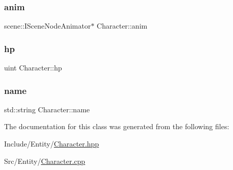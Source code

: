 \subsubsection{\texorpdfstring{anim}{anim}}
{\footnotesize\ttfamily scene\+::\+I\+Scene\+Node\+Animator$\ast$ Character\+::anim\hspace{0.3cm}{\ttfamily [protected]}}

\mbox{\label{class_character_a1f1db0752324d315af1029a7b08bdea7}} 
\subsubsection{\texorpdfstring{hp}{hp}}
{\footnotesize\ttfamily uint Character\+::hp\hspace{0.3cm}{\ttfamily [protected]}}

\mbox{\label{class_character_a6592c35167738421f3e04ca8808d37db}} 
\subsubsection{\texorpdfstring{name}{name}}
{\footnotesize\ttfamily std\+::string Character\+::name\hspace{0.3cm}{\ttfamily [protected]}}



The documentation for this class was generated from the following files\+:\begin{DoxyCompactItemize}
\item 
Include/\+Entity/\mbox{\hyperlink{_character_8hpp}{Character.\+hpp}}\item 
Src/\+Entity/\mbox{\hyperlink{_character_8cpp}{Character.\+cpp}}\end{DoxyCompactItemize}
